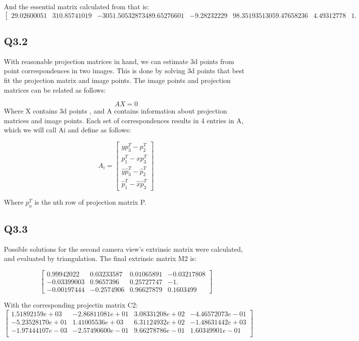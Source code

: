 \documentclass[12pt]{article}
\begin{document}
And the essential matrix calculated from that is:
$$
\begin{bmatrix}
29.02600051   &  310.85741019 & -3051.50532873
489.65276601  &  -9.28232229  & 98.3519351
3059.47658236 &    4.49312778 &    1.       
\end{bmatrix}
$$

\newpage
\subsection{Q3.2}
With reasonable projection matrices in hand, we can estimate 3d points from point correspondences in two images.  This is done by solving 3d points that best fit the projection matrix and image points.
The image points and projection matrices can be related as follows:  
  
$$
AX = 0
$$
Where X contains 3d points , and A contains information about projection matrices and image points. Each set of correspondences results in 4 entries in A, which we will call Ai and define as follows:

$$
A_{i} = 
\begin{bmatrix}
y p_{3}^{T} - p_{2}^{T} \\
p_{1}^{T} - x p_{3}^{T} \\
\hat{y} \hat{p}_{3}^{T} - \hat{p}_{2}^{T} \\
\hat{p}_{1}^{T} - \hat{x} \hat{p}_{3}^{T} 
\end{bmatrix}
$$
  
Where $p_{n}^{T}$ is the nth row of projection matrix P.

\newpage
\subsection{Q3.3}
Possible solutions for the second camera view's extrinsic matrix were calculated, and evaluated by triangulation.
The final extrinsic matrix M2 is:
  
$$
\begin{bmatrix}
0.99942022& 0.03233587& 0.01065891& -0.03217808 \\
-0.03399003& 0.9657396& 0.25727747& -1.         \\
-0.00197444& -0.2574906& 0.96627879& 0.1603499
\end{bmatrix}
$$
  
With the corresponding projectin matrix C2:
$$
\begin{bmatrix}
1.51892159e+03& -2.86811081e+01& 3.08331208e+02& -4.46572073e-01 \\
-5.23528170e+01& 1.41005536e+03& 6.31124932e+02& -1.48631442e+03 \\
-1.97444107e-03& -2.57490600e-01& 9.66278786e-01& 1.60349901e-01 \\
\end{bmatrix}
$$
  
\end{document}
